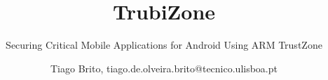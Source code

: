 \documentclass{./llncs2e/llncs}
\begin{document}
\title{TrubiZone}

\subtitle{Securing Critical Mobile Applications for Android Using ARM TrustZone}
\author{Tiago Brito, tiago.de.olveira.brito@tecnico.ulisboa.pt}

\maketitle

\setcounter{tocdepth}{2}
\makeatletter
\renewcommand*\l@author[2]{}
\renewcommand*\l@title[2]{}
\makeatletter




\pagestyle{plain}

\cleardoublepage

\cleardoublepage

\cleardoublepage

\cleardoublepage

\cleardoublepage

\cleardoublepage
\newpage
\appendix

\cleardoublepage


%
%


\end{document}

